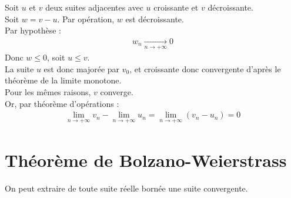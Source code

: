 \documentclass[../main.tex]{subfiles}
\begin{document}
Soit $u$ et $v$ deux suites adjacentes avec $u$ croissante et $v$ décroissante. \\
Soit $w = v - u$. Par opération, $w$ est décroissante. \\
Par hypothèse : 
\begin{align*}
    w_n \underset{n \to +\infty}{\longrightarrow} 0
\end{align*}
Donc $w \leq 0$, soit $u \leq v$. \\
La suite $u$ est donc majorée par $v_0$, et croissante donc convergente d'après le théorème de la limite monotone. \\
Pour les mêmes raisons, $v$ converge. \\
Or, par théorème d'opérations : 
\begin{align*}
    \lim_{n\to +\infty} v_n - \lim_{n\to +\infty} u_n = \lim_{n\to +\infty} (v_n - u_n) = 0
\end{align*}

\section{Théorème de Bolzano-Weierstrass}
\begin{tcolorbox}[title=Théorème 14.56, title filled=false, colframe=orange, colback=orange!10!white]
    On peut extraire de toute suite réelle bornée une suite convergente. 
\end{tcolorbox}
\end{document}
